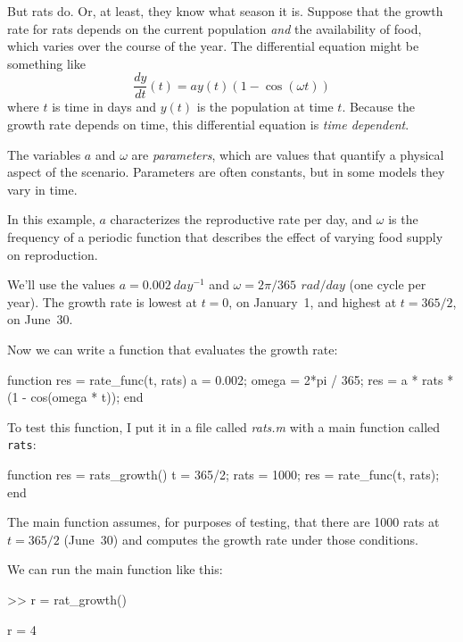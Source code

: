 
But rats do.  Or, at least, they know what season it is.
Suppose that the growth rate for rats depends on the current population \emph{and} the availability of food, which varies over the course of the year.
The differential equation might be something like
%
\begin{equation*}
\frac{dy}{dt}(t) = a y(t) \left(1 - \cos (\omega t) \right)
\end{equation*}
%
where $t$ is time in days and $y(t)$ is the population at time $t$.
Because the growth rate depends on time, this differential equation is \emph{time dependent}.

The variables $a$ and $\omega$ are \emph{parameters}, which are values that
quantify a physical aspect of the scenario.  Parameters are often constants, but in some models they vary in time.


In this example, $a$ characterizes the reproductive rate per day, and
$\omega$ is the frequency of a periodic function that describes
the effect of varying food supply on reproduction.

We'll use the values $a = \SI{0.002}{day^{-1}}$
and $\omega = 2 \pi / 365 \, \SI{}{rad/day}$ (one cycle per year).
The growth rate is lowest at $t=0$, on January~1, and highest at $t=365/2$, on June~30.

Now we can write a function that evaluates the growth rate:

\begin{code}
function res = rate_func(t, rats)
    a = 0.002;
    omega = 2*pi / 365;
    res = a * rats * (1 - cos(omega * t));
end
\end{code}

To test this function, I put it in a file called \emph{rats.m} with a main function called
\lstinline{rats}:

\begin{code}
function res = rats_growth()
    t = 365/2;
    rats = 1000;
    res = rate_func(t, rats);
end
\end{code}

The main function assumes, for purposes of testing, that
there are 1000 rats at $t=365/2$ (June~30) and computes the growth rate under those conditions.

We can run the main function like this:

\begin{code}
>> r = rat_growth()

r = 4
\end{code}

